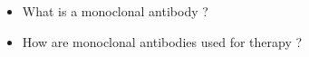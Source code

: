 \begin{frame}
    
    \begin{itemize}
        \item What is a monoclonal antibody ?
        \item How are monoclonal antibodies used for therapy ?
    \end{itemize}

\end{frame}